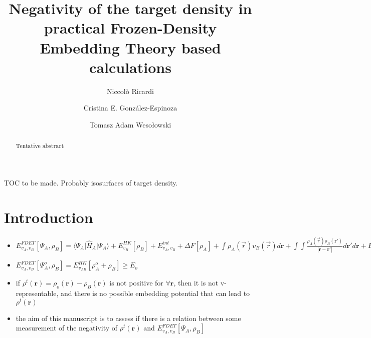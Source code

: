 \documentclass[journal=jctcce,manuscript=article, layout=onecolumn]{achemso}
\author{Niccol\`{o} Ricardi}
\author{Cristina E. Gonz\'{a}lez-Espinoza}
\author{Tomasz Adam Weso\l{}owski}
\affiliation[University of Geneva]
{Department of Physical Chemistry, University of Geneva, Geneva (Switzerland)}
\title[Negativity of the target density]
  {Negativity of the target density in practical Frozen-Density Embedding Theory based calculations}
\begin{document}
\begin{tocentry}

TOC to be made. Probably isosurfaces of target density.

\end{tocentry}


\begin{abstract}
Tentative abstract
\end{abstract}

\section{Introduction}
\begin{itemize}
 \item ${E}_{v_A,v_B}^{FDET}[\Psi_{A},\rho_B] = \langle\Psi_{A}\vert \hat{H}_A\vert \Psi_{A}\rangle +E^{HK}_{v_B}[\rho_B]+E_{v_{A},v_{B}}^{int} + \Delta F[\rho_A] + \int
{\rho_A(\vec{r})v_B(\vec{r})}d\mathbf{r} + \int\int \frac{\rho_A(\vec{r})\rho_B(\mathbf{r}')} {\left\vert \mathbf{r}-\mathbf{r}'\right\vert}d\mathbf{r}'d\mathbf{r}  
+ {E}_{xcT}^{nad}[\rho_A,\rho_B] +\int
{\rho_B(\vec{r})v_A(\vec{r})}d\mathbf{r}$
 \item ${E}_{v_A,v_B}^{FDET}[\Psi_{A}^{o},\rho_B]=E_{v_{AB}}^{HK}[\rho_A^{o}+\rho_B] \ge E_o$
 \item if $\rho^t(\mathbf{r}) = \rho_o(\mathbf{r}) - \rho_B(\mathbf{r})$ is not positive for $\forall \mathbf{r}$, then it is not v-representable, and there is no possible embedding potential that can lead to $\rho^t(\mathbf{r})$
 \item the aim of this manuscript is to assess if there is a relation between some measurement of the negativity of $\rho^t(\mathbf{r})$ and ${E}_{v_A,v_B}^{FDET}[\Psi_{A},\rho_B]$

\end{itemize}
\end{document}
